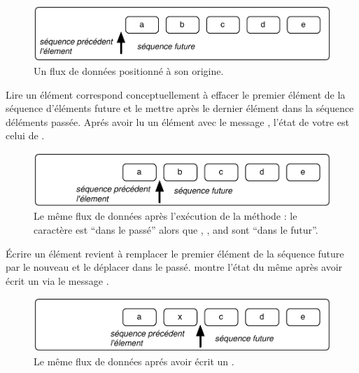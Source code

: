 \documentclass[a4paper,10pt,twoside]{book}
\begin{document}
\begin{figure}[ht]
\centerline{\includegraphics[scale=0.5]{_abcdeStef}}
\caption{Un flux de donn\'ees positionn\'e \`a son origine.}
\label{fig:_abcde}
\vspace{.2in}
\end{figure}

Lire un \'el\'ement correspond conceptuellement \`a effacer le premier \'el\'ement de la s\'equence d'\'el\'ements future et le mettre apr\`es le dernier \'el\'ement dans la s\'equence d\'el\'ements pass\'ee.
Apr\'es avoir lu un \'el\'ement avec le message , l'\'etat de votre \stream est celui de .

\begin{figure}[ht]
\centerline{\includegraphics[scale=0.5]{a_bcdeStef}}
\caption{Le m\^eme flux de donn\'ees apr\`es l'ex\'ecution de la m\'ethode : le caract\`ere  est ``dans le pass\'e'' alors que , ,  and  sont ``dans le futur''.}
\label{fig:a_bcde}
\vspace{.2in}
\end{figure}

\'Ecrire un \'el\'ement revient \`a remplacer le premier \'el\'ement de la s\'equence future par le nouveau et le d\'eplacer dans le pass\'e.  montre l'\'etat du m\^eme \stream apr\`es avoir \'ecrit un  via le message  .

\begin{figure}[h!t]
\centerline{\includegraphics[scale=0.5]{ax_cdeStef}}
\caption{Le m\^eme flux de donn\'ees apr\'es avoir \'ecrit un .}
\label{fig:ax_cde}
\vspace{.2in}
\end{figure}
\end{document}

